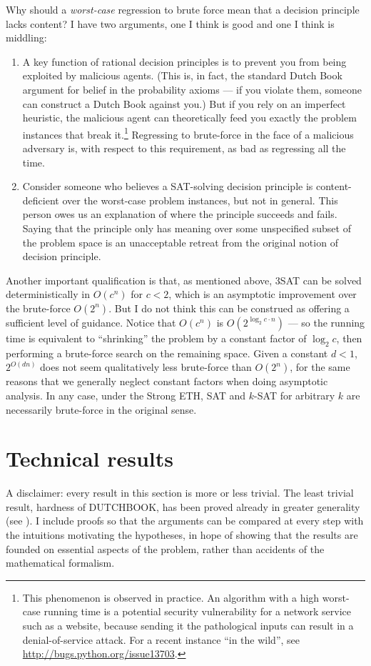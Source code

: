 \documentclass[letterpaper,12pt]{article}
\begin{document}
Why should a \emph{worst-case} regression to brute force mean that a decision principle lacks content? I have two arguments, one I think is good and one I think is middling:

\begin{enumerate}
\item
A key function of rational decision principles is to prevent you from being exploited by malicious agents. (This is, in fact, the standard Dutch Book argument for belief in the probability axioms --- if you violate them, someone can construct a Dutch Book against you.) But if you rely on an imperfect heuristic, the malicious agent can theoretically feed you exactly the problem instances that break it.\footnote{This phenomenon is observed in practice. An algorithm with a high worst-case running time is a potential security vulnerability for a network service such as a website, because sending it the pathological inputs can result in a denial-of-service attack. For a recent instance ``in the wild'', see \url{http://bugs.python.org/issue13703}.} Regressing to brute-force in the face of a malicious adversary is, with respect to this requirement, as bad as regressing all the time.
\item
Consider someone who believes a SAT-solving decision principle is content-deficient over the worst-case problem instances, but not in general. This person owes us an explanation of where the principle succeeds and fails. Saying that the principle only has meaning over some unspecified subset of the problem space is an unacceptable retreat from the original notion of decision principle.
\end{enumerate}

Another important qualification is that, as mentioned above, 3SAT can be solved deterministically in $O(c^n)$ for $c < 2$, which is an asymptotic improvement over the brute-force $O(2^n)$. But I do not think this can be construed as offering a sufficient level of guidance. Notice that $O(c^n)$ is $O(2^{\log_2 c \cdot n})$ --- so the running time is equivalent to ``shrinking'' the problem by a constant factor of $\log_2 c$, then performing a brute-force search on the remaining space. Given a constant $d < 1$, $2^{O(dn)}$ does not seem qualitatively less brute-force than $O(2^n)$, for the same reasons that we generally neglect constant factors when doing asymptotic analysis. In any case, under the Strong ETH, SAT and $k$-SAT for arbitrary $k$ are necessarily brute-force in the original sense.

\section{Technical results}
\label{technicalResults}
A disclaimer: every result in this section is more or less trivial. The least trivial result, hardness of DUTCHBOOK, has been proved already in greater generality (see \cite{paris1994uncertain}). I include proofs so that the arguments can be compared at every step with the intuitions motivating the hypotheses, in hope of showing that the results are founded on essential aspects of the problem, rather than accidents of the mathematical formalism.
\end{document}

